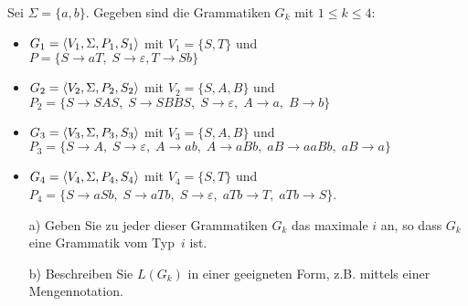 
\begin{exercise}
Sei $\Sigma=\{a,b\}$. Gegeben sind die Grammatiken $G_k$ mit $1\le k\le 4$:
\begin{itemize}
\item $G_1=\langle{V_1,\Sigma,P_1,S_1}\rangle$ mit
      $V_1=\{S,T\}$ und \\
      $P=\{S\rightarrow aT,\;S\rightarrow \varepsilon, T\rightarrow Sb\}$
\item $G_2=\langle{V_2,\Sigma,P_2,S_2}\rangle$ mit
      $V_2=\{S,A,B\}$ und \\
      $P_2=\{S\rightarrow SAS,\;S\rightarrow SBBS,\;S\rightarrow
      \varepsilon,\;A\rightarrow a,\;B\rightarrow
      b\}$
\item $G_3=\langle{V_3,\Sigma,P_3,S_3}\rangle$ mit
      $V_3=\{S,A,B\}$ und \\
      $P_3=\{S\rightarrow A,\;S\rightarrow \varepsilon,\;A\rightarrow
      ab,\;A\rightarrow aBb,\;aB\rightarrow
      aaBb,\; aB\rightarrow a\}$
\item $G_4=\langle{V_4,\Sigma,P_4,S_4}\rangle$ mit
      $V_4=\{S,T\}$ und \\
      $P_4=\{S\rightarrow aSb,\;S\rightarrow aTb,\;S\rightarrow \varepsilon,\;aTb\rightarrow
      T,\;aTb\rightarrow S\}$.
\end{itemize}
\begin{enumerate}
\item[a)] Geben Sie zu jeder dieser Grammatiken $G_k$ das maximale $i$ an, so dass $G_k$ eine Grammatik vom Typ~$i$ ist.
\item[b)] Beschreiben Sie $L(G_k)$ in einer geeigneten Form, z.B. mittels einer Mengennotation.  
\end{enumerate}
\end{exercise}
